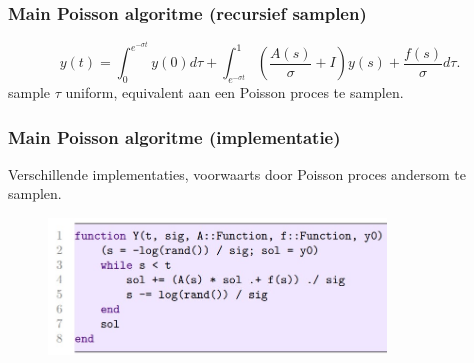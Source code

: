 \documentclass[18pt,aspectratio=149]{beamer}
\begin{document}
\begin{frame}
    \frametitle{Main Poisson algoritme (recursief samplen)}

    \begin{equation} \label{eq:poisson main 2}
        y(t) = \int_{0}^{e^{-\sigma t}}  y(0) d\tau
        + \int_{e^{-\sigma t}}^{1} \left(  \frac{A(s)}{\sigma} + I\right)  y(s) + \frac{f(s)}{\sigma} d\tau.
    \end{equation}
    sample $\tau$ uniform, equivalent aan een Poisson proces te samplen. \\
    \action<+->{}
\end{frame}

\begin{frame}
    \frametitle{Main Poisson algoritme (implementatie)}
    Verschillende implementaties, voorwaarts door Poisson proces andersom
    te samplen.
    \begin{figure}[h!]
        \centering
        \includegraphics[width=0.8\textwidth]{imgs/main poisson julia.jpg}
        \label{fig:imgs/main poisson julia.jpg}
    \end{figure}
\end{frame}
\end{document}
